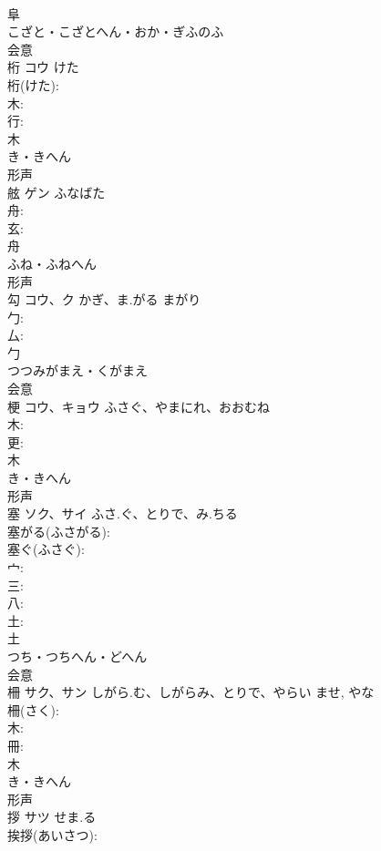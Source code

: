 \documentclass[8pt]{extreport}
\begin{document}
\begin{CJK}{UTF8}{min}
\\	阜	
\\	こざと・こざとへん・おか・ぎふのふ	
\\	会意 
\\	桁	コウ	けた		
\\	桁(けた): 
\\	木: 
\\	行: 
\\	木	
\\	き・きへん	
\\	形声 
\\	舷	ゲン	ふなばた		
\\	舟: 
\\	玄: 
\\	舟	
\\	ふね・ふねへん	
\\	形声 
\\	勾	コウ、ク	かぎ、ま.がる	まがり	
\\	勹: 
\\	厶: 
\\	勹	
\\	つつみがまえ・くがまえ	
\\	会意 
\\	梗	コウ、キョウ	ふさぐ、やまにれ、おおむね		
\\	木: 
\\	更: 
\\	木	
\\	き・きへん	
\\	形声 
\\	塞	ソク、サイ	ふさ.ぐ、とりで、み.ちる		
\\	塞がる(ふさがる): 
\\	塞ぐ(ふさぐ): 
\\	宀: 
\\	三: 
\\	八: 
\\	土: 
\\	土	
\\	つち・つちへん・どへん	
\\	会意 
\\	柵	サク、サン	しがら.む、しがらみ、とりで、やらい	ませ, やな	
\\	柵(さく): 
\\	木: 
\\	冊: 
\\	木	
\\	き・きへん	
\\	形声 
\\	拶	サツ	せま.る		
\\	挨拶(あいさつ): 

\end{CJK}
\end{document}
